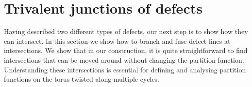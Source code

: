 \documentclass[11pt]{article}
\newcommand{\dave}[1]{{\color{red}\footnotesize{(DA) #1}}}
\newcommand{\paul}[1]{{\color{blue}\footnotesize{(PF) #1}}}
\numberwithin{equation}{section}		%
\begin{document}


\section{Trivalent junctions of defects}
\label{sec:trivalent}

Having described two different types of defects, our next step is to show how they can intersect. In this section we show how to branch and fuse defect lines at intersections. We show that in our construction, it is quite straightforward to find intersections that can be moved around without changing the partition function. Understanding these intersections is essential for defining and analysing partition functions on the torus twisted along multiple cycles.
\end{document}
